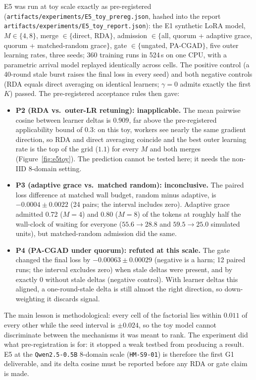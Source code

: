 \documentclass[11pt,a4paper]{article}
\begin{document}
E5 was run at toy scale exactly as pre-registered (\texttt{artifacts/experiments/E5\_toy\_prereg.json}, hashed into the report \texttt{artifacts/experiments/E5\_toy\_report.json}): the E1 synthetic LoRA model, $M\in\{4,8\}$, merge $\in\{$direct, RDA$\}$, admission $\in\{$all, quorum + adaptive grace, quorum + matched-random grace$\}$, gate $\in\{$ungated, PA-CGAD$\}$, five outer learning rates, three seeds; 360 training runs in 524\,s on one CPU, with a parametric arrival model replayed identically across cells. The positive control (a 40-round stale burst raises the final loss in every seed) and both negative controls (RDA equals direct averaging on identical learners; $\gamma=0$ admits exactly the first $K$) passed. The pre-registered acceptance rules then gave:
\begin{itemize}[leftmargin=1.8em]
    \item \textbf{P2 (RDA vs.\ outer-LR retuning): inapplicable.} The mean pairwise cosine between learner deltas is $\mathbf{0.909}$, far above the pre-registered applicability bound of $0.3$: on this toy, workers see nearly the same gradient direction, so RDA and direct averaging coincide and the best outer learning rate is the top of the grid ($1.1$) for every $M$ and both merges (Figure~\ref{fig:e5toy}). The prediction cannot be tested here; it needs the non-IID 8-domain setting.
    \item \textbf{P3 (adaptive grace vs.\ matched random): inconclusive.} The paired loss difference at matched wall budget, random minus adaptive, is $-0.0004 \pm 0.0022$ (24 pairs; the interval includes zero). Adaptive grace admitted 0.72 ($M{=}4$) and 0.80 ($M{=}8$) of the tokens at roughly half the wall-clock of waiting for everyone ($55.6 \to 28.8$ and $59.5 \to 25.0$ simulated units), but matched-random admission did the same.
    \item \textbf{P4 (PA-CGAD under quorum): refuted at this scale.} The gate changed the final loss by $-0.00063 \pm 0.00029$ (negative is a harm; 12 paired runs; the interval excludes zero) when stale deltas were present, and by exactly $0$ without stale deltas (negative control). With learner deltas this aligned, a one-round-stale delta is still almost the right direction, so down-weighting it discards signal.
\end{itemize}
The main lesson is methodological: every cell of the factorial lies within $0.011$ of every other while the seed interval is $\pm 0.024$, so the toy model cannot discriminate between the mechanisms it was meant to rank. The experiment did what pre-registration is for: it stopped a weak testbed from producing a result. E5 at the \texttt{Qwen2.5-0.5B} 8-domain scale (\texttt{HM-S9-01}) is therefore the first G1 deliverable, and its delta cosine must be reported before any RDA or gate claim is made.
\end{document}

